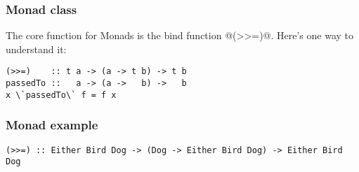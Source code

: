 \documentclass{beamer}
\begin{document}
%
%
%
%
%
%



\begin{frame}

\frametitle{Monad class}
The core function for Monads is the bind function @(>>=)@. Here's one way to understand it:

\begin{lstlisting}
(>>=)    :: t a -> (a -> t b) -> t b
passedTo ::   a -> (a ->   b) ->   b
x \`passedTo\` f = f x
\end{lstlisting}



\end{frame}



\begin{frame}
\frametitle{Monad example}

\begin{lstlisting}[frame=single]
(>>=) :: Either Bird Dog -> (Dog -> Either Bird Dog) -> Either Bird Dog
\end{lstlisting}

%
%
%
%

\end{frame}
\end{document}
